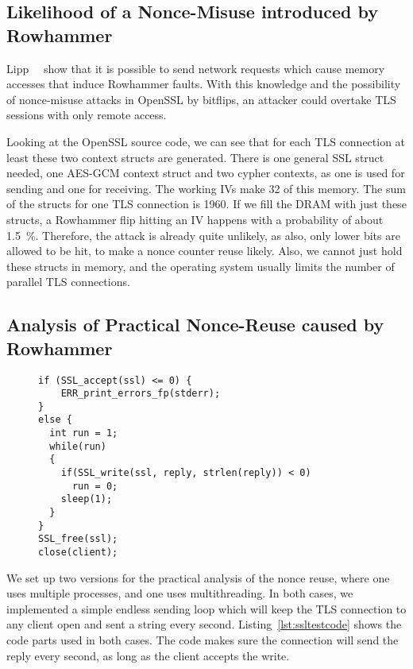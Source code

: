 \subsection{Likelihood of a Nonce-Misuse introduced by Rowhammer}

Lipp~\etal~\cite{nethammer} show that it is possible to send network requests
which cause memory accesses that induce Rowhammer faults. With this knowledge
and the possibility of nonce-misuse attacks in OpenSSL by bitflips, an attacker
could overtake TLS sessions with only remote access.

Looking at the OpenSSL source code, we can see that for each TLS connection at
least these two context structs are generated. There is one general SSL struct
needed, one AES-GCM context struct and two cypher contexts, as one is used for
sending and one for receiving. The working IVs make \SI{32}{\byte} of this
memory. The sum of the structs for one TLS connection is \SI{1960}{\byte}. If we
fill the DRAM with just these structs, a Rowhammer flip hitting an IV happens
with a probability of about \SI{1.5}{\percent}. Therefore, the attack is already
quite unlikely, as also, only lower bits are allowed to be hit, to make a nonce
counter reuse likely. Also, we cannot just hold these structs in memory, and the
operating system usually limits the number of parallel TLS connections.

\subsection{Analysis of Practical Nonce-Reuse caused by Rowhammer}

\begin{figure}
\begin{minipage}{\linewidth}
\begin{lstlisting}[style=CStyle,
                   caption={Code showing an example for a simple TLS server,
keeping sending a reply until the client disconnects.},
                   label={lst:ssltestcode}]
if (SSL_accept(ssl) <= 0) {
    ERR_print_errors_fp(stderr);
}
else {
  int run = 1;
  while(run)
  {
    if(SSL_write(ssl, reply, strlen(reply)) < 0)
      run = 0;
    sleep(1);
  }
}
SSL_free(ssl);
close(client);
\end{lstlisting}
\end{minipage}
\end{figure}

We set up two versions for the practical analysis of the nonce reuse, where one
uses multiple processes, and one uses multithreading. In both cases, we
implemented a simple endless sending loop which will keep the TLS connection to
any client open and sent a string every second. Listing~\ref{lst:ssltestcode}
shows the code parts used in both cases. The code makes sure the connection will
send the reply every second, as long as the client accepts the write.

